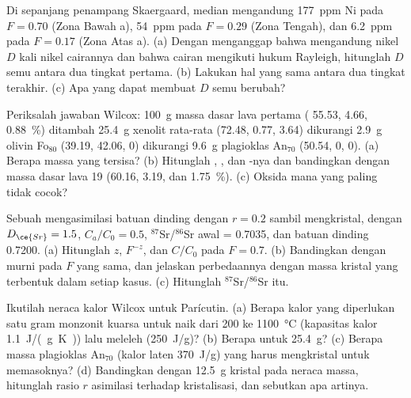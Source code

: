 \begin{exercise}[$\star\star$]\label{exo:b2:magmatic-differentiation:8}
Di sepanjang penampang Skaergaard,  median mengandung \qty{177}{ppm} Ni pada
$F = 0.70$ (Zona Bawah a), \qty{54}{ppm} pada $F = 0.29$ (Zona Tengah), dan
\qty{6.2}{ppm} pada $F = 0.17$ (Zona Atas a). (a) Dengan menganggap bahwa  mengandung nikel
$D$ kali nikel cairannya dan bahwa cairan mengikuti hukum Rayleigh,
hitunglah $D$ semu antara dua tingkat pertama. (b) Lakukan hal yang sama antara
dua tingkat terakhir. (c) Apa yang dapat membuat $D$ semu berubah?
\end{exercise}

\begin{exercise}[$\star\star$]\label{exo:b2:magmatic-differentiation:9}
Periksalah jawaban Wilcox: \qty{100}{g} massa dasar lava pertama (
55.53,  4.66,  \qty{0.88}{\percent}) ditambah \qty{25.4}{g} xenolit
rata-rata (72.48, 0.77, 3.64) dikurangi \qty{2.9}{g} olivin Fo$_{80}$ (39.19, 42.06, 0)
dikurangi \qty{9.6}{g} plagioklas An$_{70}$ (50.54, 0, 0). (a) Berapa massa yang tersisa?
(b) Hitunglah , , dan -nya dan bandingkan dengan massa dasar
lava 19 (60.16, 3.19, dan \qty{1.75}{\percent}). (c) Oksida mana yang paling tidak cocok?
\end{exercise}

\begin{exercise}[$\star\star\star$]\label{exo:b2:magmatic-differentiation:10}
Sebuah  mengasimilasi batuan dinding dengan $r = 0.2$ sambil mengkristal, dengan $D_{\ce{Sr}} =
1.5$, $C_a/C_0 = 0.5$, $^{87}$Sr/$^{86}$Sr awal = 0.7035, dan batuan dinding 0.7200.
(a) Hitunglah $z$, $F^{-z}$, dan $C/C_0$ pada $F = 0.7$. (b) Bandingkan dengan  murni pada $F$ yang sama, dan jelaskan perbedaannya dengan massa kristal
yang terbentuk dalam setiap kasus. (c) Hitunglah $^{87}$Sr/$^{86}$Sr  itu.
\end{exercise}

\begin{exercise}[$\star\star\star$]\label{exo:b2:magmatic-differentiation:11}
Ikutilah neraca kalor Wilcox untuk Parícutin. (a) Berapa kalor yang diperlukan satu gram monzonit
kuarsa untuk naik dari 200 ke \qty{1100}{\celsius} (kapasitas kalor
\qty{1.1}{J/(g.K)}) lalu meleleh (\qty{250}{J/g})? (b) Berapa untuk
\qty{25.4}{g}? (c) Berapa massa plagioklas An$_{70}$ (kalor laten \qty{370}{J/g})
yang harus mengkristal untuk memasoknya? (d) Bandingkan dengan \qty{12.5}{g} kristal pada
neraca massa, hitunglah rasio $r$ asimilasi terhadap kristalisasi, dan sebutkan apa
artinya.
\end{exercise}

